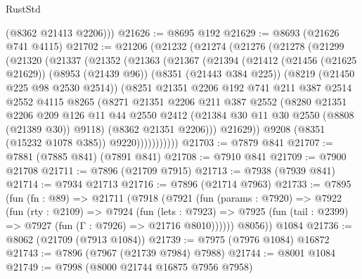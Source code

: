 \begin{lexlean}{RustStd}
\begin{coremodule}
        (@8362 @21413 @2206)))
@21626 := @8695 @192
@21629 := @8693 (@21626 @741 @4115)
@21702 := @21206
    (@21232
      (@21274
        (@21276
          (@21278
            (@21299
              (@21320
                (@21337
                  (@21352
                    (@21363
                      (@21367
                        (@21394
                          (@21412
                            (@21456 (@21625 @21629))
                            (@8953 (@21439 @96))
                            (@8351 (@21443 @384 @225))
                            (@8219 (@21450 @225 @98 @2530 @2514))
                            (@8251
                              @21351
                              @2206
                              @192
                              @741
                              @211
                              @387
                              @2514
                              @2552
                              @4115
                              @8265
                              (@8271
                                @21351
                                @2206
                                @211
                                @387
                                @2552
                                (@8280
                                  @21351
                                  @2206
                                  @209
                                  @126
                                  @11
                                  @44
                                  @2550
                                  @2412
                                  (@21384 @30 @11 @30 @2550 (@8808 (@21389 @30)) @9118)
                                  (@8362 @21351 @2206)))
                              @21629))
                          @9208
                          (@8351 (@15232 @1078 @385))
                          @9220)))))))))))
@21703 := @7879 @841
@21707 := @7881 (@7885 @841) (@7891 @841)
@21708 := @7910 @841
@21709 := @7900 @21708
@21711 := @7896 (@21709 @7915)
@21713 := @7938 (@7939 @841)
@21714 := @7934 @21713
@21716 := @7896 (@21714 @7963)
@21733 := @7895
    (fun (fn : @89) =>
    @21711
      (@7918
        (@7921
          (fun (params : @7920) =>
          @7922
            (fun (rty : @2109) =>
            @7924
              (fun (lets : @7923) =>
              @7925 (fun (tail : @2399) => @7927 (fun (Γ : @7926) => @21716 @8010))))))
        @8056))
    @1084
@21736 := @8062 (@21709 (@7913 @1084))
@21739 := @7975 (@7976 @1084) @16872
@21743 := @7896 (@7967 (@21739 @7984) @7988)
@21744 := @8001 @1084
@21749 := @7998 (@8000 @21744 @16875 @7956 @7958)

\end{coremodule}
\end{lexlean}
